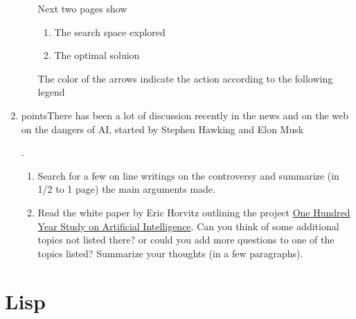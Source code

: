 \documentclass[11pt]{article}  %
\begin{document}
\begin{enumerate}
\begin{enumerate}
      Next two pages show 
        \begin{enumerate}
          \item The search space explored
          \item The optimal soluion
        \end{enumerate}
    The color of the arrows indicate the action according to the following
    legend
    \par{}
    
    
    \end{enumerate}
    \item {} points\rbrack There has been a lot of discussion recently
    in the news and on the web on the dangers of AI, started by Stephen Hawking and Elon
    Musk
    \par.
    \begin{enumerate}
    \item Search for a few on line writings on the controversy and summarize (in
    1/2 to 1 page) the main arguments made.
    \item Read the white paper by Eric Horvitz outlining the project
    \href{https://stanford.app.box.com/s/266hrhww2l3gjoy9euar}{One Hundred Year Study on Artificial Intelligence}.
    Can you think of some additional topics not listed there? or could you add more
    questions to one of the topics listed? Summarize your thoughts (in a few
    paragraphs).
    \end{enumerate}
    \end{enumerate}
\section{Lisp}
\end{document}
